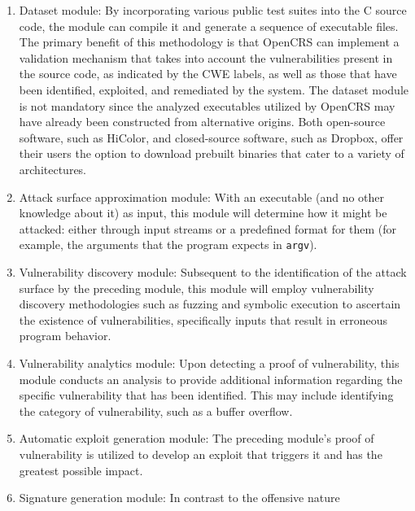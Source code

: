 \documentclass[../main.tex]{subfiles}
\begin{document}
\begin{enumerate}
  \def\labelenumi{\arabic{enumi}.}
  \tightlist
  \item
        Dataset module: By incorporating various public test suites into the C
        source code, the module can compile it and generate a sequence of
        executable files. The primary benefit of this methodology is that
        OpenCRS can implement a validation mechanism that takes into account
        the vulnerabilities present in the source code, as indicated by the
        CWE labels, as well as those that have been identified, exploited, and
        remediated by the system. The dataset module is not mandatory since
        the analyzed executables utilized by OpenCRS may have already been
        constructed from alternative origins. Both open-source software, such
        as HiColor, and closed-source software, such as Dropbox, offer their
        users the option to download prebuilt binaries that cater to a variety
        of architectures.
  \item
        Attack surface approximation module: With an executable (and no other
        knowledge about it) as input, this module will determine how it might
        be attacked: either through input streams or a predefined format for
        them (for example, the arguments that the program expects in
        \texttt{argv}).
  \item
        Vulnerability discovery module: Subsequent to the identification of
        the attack surface by the preceding module, this module will employ
        vulnerability discovery methodologies such as fuzzing and symbolic
        execution to ascertain the existence of vulnerabilities, specifically
        inputs that result in erroneous program behavior.
  \item
        Vulnerability analytics module: Upon detecting a proof of
        vulnerability, this module conducts an analysis to provide additional
        information regarding the specific vulnerability that has been
        identified. This may include identifying the category of
        vulnerability, such as a buffer overflow.
  \item
        Automatic exploit generation module: The preceding module's proof of
        vulnerability is utilized to develop an exploit that triggers it and
        has the greatest possible impact.
  \item
        Signature generation module: In contrast to the offensive nature

\end{enumerate}
\end{document}

